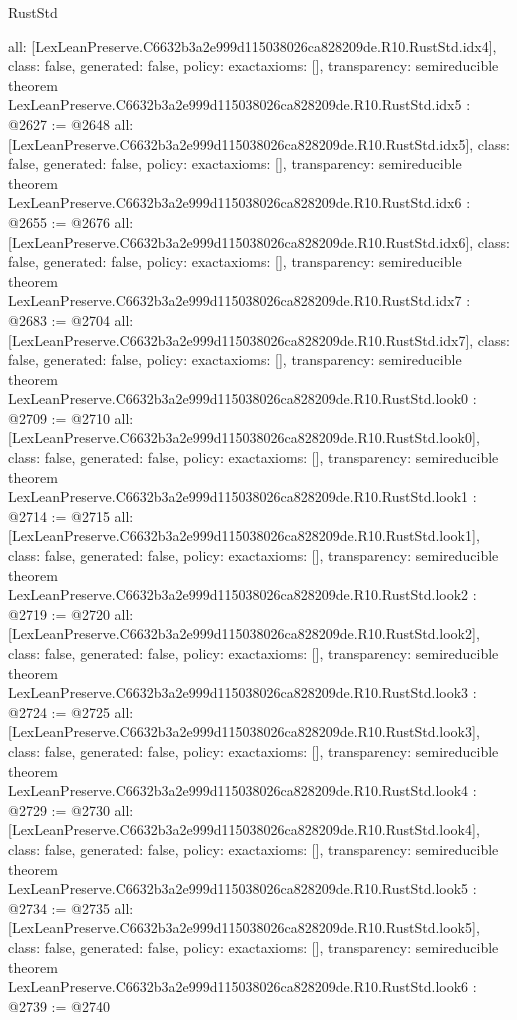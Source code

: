\begin{lexlean}{RustStd}
\begin{coremodule}
{  all: [LexLeanPreserve.C6632b3a2e999d115038026ca828209de.R10.RustStd.idx4],
  class: false,
  generated: false,
  policy: exact{axioms: []},
  transparency: semireducible
}
theorem LexLeanPreserve.C6632b3a2e999d115038026ca828209de.R10.RustStd.idx5 : @2627 := @2648 {
  all: [LexLeanPreserve.C6632b3a2e999d115038026ca828209de.R10.RustStd.idx5],
  class: false,
  generated: false,
  policy: exact{axioms: []},
  transparency: semireducible
}
theorem LexLeanPreserve.C6632b3a2e999d115038026ca828209de.R10.RustStd.idx6 : @2655 := @2676 {
  all: [LexLeanPreserve.C6632b3a2e999d115038026ca828209de.R10.RustStd.idx6],
  class: false,
  generated: false,
  policy: exact{axioms: []},
  transparency: semireducible
}
theorem LexLeanPreserve.C6632b3a2e999d115038026ca828209de.R10.RustStd.idx7 : @2683 := @2704 {
  all: [LexLeanPreserve.C6632b3a2e999d115038026ca828209de.R10.RustStd.idx7],
  class: false,
  generated: false,
  policy: exact{axioms: []},
  transparency: semireducible
}
theorem LexLeanPreserve.C6632b3a2e999d115038026ca828209de.R10.RustStd.look0 : @2709 := @2710 {
  all: [LexLeanPreserve.C6632b3a2e999d115038026ca828209de.R10.RustStd.look0],
  class: false,
  generated: false,
  policy: exact{axioms: []},
  transparency: semireducible
}
theorem LexLeanPreserve.C6632b3a2e999d115038026ca828209de.R10.RustStd.look1 : @2714 := @2715 {
  all: [LexLeanPreserve.C6632b3a2e999d115038026ca828209de.R10.RustStd.look1],
  class: false,
  generated: false,
  policy: exact{axioms: []},
  transparency: semireducible
}
theorem LexLeanPreserve.C6632b3a2e999d115038026ca828209de.R10.RustStd.look2 : @2719 := @2720 {
  all: [LexLeanPreserve.C6632b3a2e999d115038026ca828209de.R10.RustStd.look2],
  class: false,
  generated: false,
  policy: exact{axioms: []},
  transparency: semireducible
}
theorem LexLeanPreserve.C6632b3a2e999d115038026ca828209de.R10.RustStd.look3 : @2724 := @2725 {
  all: [LexLeanPreserve.C6632b3a2e999d115038026ca828209de.R10.RustStd.look3],
  class: false,
  generated: false,
  policy: exact{axioms: []},
  transparency: semireducible
}
theorem LexLeanPreserve.C6632b3a2e999d115038026ca828209de.R10.RustStd.look4 : @2729 := @2730 {
  all: [LexLeanPreserve.C6632b3a2e999d115038026ca828209de.R10.RustStd.look4],
  class: false,
  generated: false,
  policy: exact{axioms: []},
  transparency: semireducible
}
theorem LexLeanPreserve.C6632b3a2e999d115038026ca828209de.R10.RustStd.look5 : @2734 := @2735 {
  all: [LexLeanPreserve.C6632b3a2e999d115038026ca828209de.R10.RustStd.look5],
  class: false,
  generated: false,
  policy: exact{axioms: []},
  transparency: semireducible
}
theorem LexLeanPreserve.C6632b3a2e999d115038026ca828209de.R10.RustStd.look6 : @2739 := @2740 {
}
\end{coremodule}
\end{lexlean}
